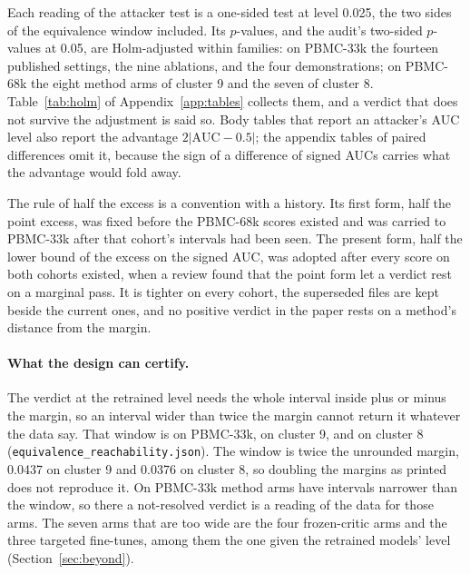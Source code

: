 \documentclass{article}
\begin{document}
Each reading of the attacker test is a one-sided test at level 0.025, the two sides of the equivalence window included. Its $p$-values, and the audit's two-sided $p$-values at 0.05, are Holm-adjusted within families: on PBMC-33k the fourteen published settings, the nine ablations, and the four demonstrations; on PBMC-68k the eight method arms of cluster 9 and the seven of cluster 8. Table~\ref{tab:holm} of Appendix~\ref{app:tables} collects them, and a verdict that does not survive the adjustment is said so. Body tables that report an attacker's AUC level also report the advantage $2|\mathrm{AUC}-0.5|$; the appendix tables of paired differences omit it, because the sign of a difference of signed AUCs carries what the advantage would fold away.

The rule of half the excess is a convention with a history. Its first form, half the point excess, was fixed before the PBMC-68k scores existed and was carried to PBMC-33k after that cohort's intervals had been seen. The present form, half the lower bound of the excess on the signed AUC, was adopted after every score on both cohorts existed, when a review found that the point form let a verdict rest on a marginal pass. It is tighter on every cohort, the superseded files are kept beside the current ones, and no positive verdict in the paper rests on a method's distance from the margin.

\paragraph{What the design can certify.} The verdict at the retrained level needs the whole interval inside plus or minus the margin, so an interval wider than twice the margin cannot return it whatever the data say. That window is  on PBMC-33k,  on cluster 9, and  on cluster 8 (\texttt{equivalence\_reachability.json}). The window is twice the unrounded margin, 0.0437 on cluster 9 and 0.0376 on cluster 8, so doubling the margins as printed does not reproduce it. On PBMC-33k  method arms have intervals narrower than the window, so there a not-resolved verdict is a reading of the data for those arms. The seven arms that are too wide are the four frozen-critic arms and the three targeted fine-tunes, among them the one given the retrained models' level (Section~\ref{sec:beyond}).
\end{document}
